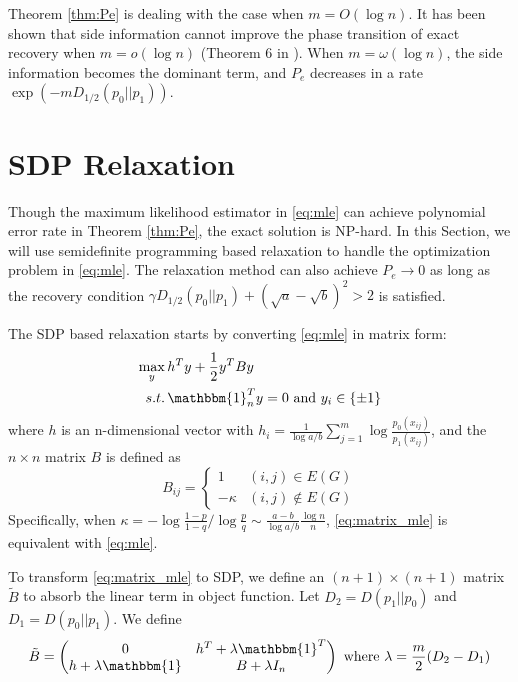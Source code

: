 \documentclass[conference]{IEEEtran}
\begin{document}
	Theorem \ref{thm:Pe} is dealing with the case when $m=O(\log n)$. It has been shown
	that side information cannot improve the phase transition of exact recovery when $m=o(\log n)$ (Theorem 6 in \cite{saad2018community}). When $m=\omega(\log n)$,
	the side information becomes the dominant term, and $P_e$ decreases in a rate $\exp(-m D_{1/2}(p_0||p_1) )$.
	
	\section{SDP Relaxation}
	Though the maximum likelihood estimator in \eqref{eq:mle} can achieve polynomial
	error rate in Theorem \ref{thm:Pe}, the exact solution is NP-hard. In this
	Section, we will use semidefinite programming based relaxation to handle
	the optimization problem in \eqref{eq:mle}. The relaxation method
	can also achieve $P_e\to 0$ as long as the recovery condition
	$\gamma D_{1/2}(p_0||p_1) + (\sqrt{a} - \sqrt{b})^2 > 2$ is satisfied.
	
	The SDP based relaxation starts by converting \eqref{eq:mle} in matrix form:
	\begin{align}
	\max_{y}\, & h^T y + \frac{1}{2}y^T B y \notag \\
	s.t.\, & \mathbbm{1}_n^T y = 0 \text{ and } y_i \in \{\pm 1 \} \label{eq:matrix_mle}
	\end{align}
	where $h$ is an n-dimensional vector with $h_i = \frac{1}{\log a/b}\sum_{j=1}^m \log \frac{p_0(x_{ij})}{p_1(x_{ij})}$, and the $n\times n $ matrix $B$ is defined as
	\begin{equation}
	B_{ij} = \begin{cases}
	1 & (i,j)\in E(G) \\
	-\kappa & (i,j) \not\in E(G)
	\end{cases}
	\end{equation}
	Specifically, when $\kappa = -\log\frac{1-p}{1-q} / \log\frac{p}{q} \sim \frac{a-b}{\log a/b}\frac{\log n}{n}$, \eqref{eq:matrix_mle} is equivalent with \eqref{eq:mle}. 
	
	To transform \eqref{eq:matrix_mle} to SDP, we define an $(n+1) \times (n+1)$ matrix $\widetilde{B}$
	to absorb the linear term in object function.
	Let $D_2 = D(p_1 || p_0)$ and $D_1 = D(p_0 || p_1)$. We define
	\begin{equation}
	\tilde{B} = \begin{pmatrix} 0 & h^T + \lambda \mathbbm{1}^T \\ h + \lambda \mathbbm{1} & B + \lambda I_n \end{pmatrix}
	\textrm{ where } \lambda = \frac{m}{2}(D_2 - D_1) 
	\end{equation}
	
\end{document}
